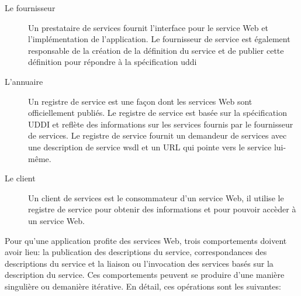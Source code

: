     \SpecialItem
    \begin{description} %
    \item[Le fournisseur] Un prestataire de services fournit
      l'interface pour le service Web et l'implémentation de
      l'application. Le fournisseur de service est également
      responsable de la création de la définition du service et de
      publier cette définition pour répondre à la spécification
      \acrshort{uddi}



  
    \item[L'annuaire] Un registre de service est une façon dont les
      services Web sont officiellement publiés. Le registre de service
      est basée sur la spécification \textsc{UDDI} et reflète des
      informations sur les services fournis par le fournisseur de
      services. Le registre de service fournit un demandeur de
      services avec une description de service \acrshort{wsdl} et un
      \textsc{URL} qui pointe vers le service lui-même.


  
    \item[Le client] Un client de services est le consommateur d'un
      service Web, il utilise le registre de service pour obtenir des
      informations et pour pouvoir accèder à un service Web.
      
    \end{description}

    Pour qu'une application profite des services Web, trois
    comportements doivent avoir lieu: la publication des descriptions
    du service, correspondances des descriptions du service et la
    liaison ou l'invocation des services basés sur la description du
    service. Ces comportements peuvent se produire d'une manière
    singulière ou demanière itérative. En détail, ces opérations sont
    les suivantes:

